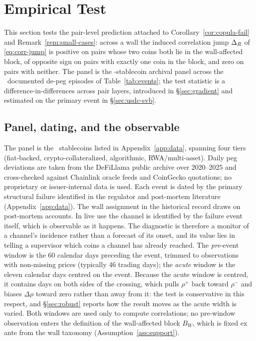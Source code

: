 
\section{Empirical Test}\label{sec:empirical}
This section tests the pair-level prediction attached to Corollary~\ref{cor:copula-fail} and Remark~\ref{rem:small-cases}: across a wall the induced correlation jump $\Delta_R$ of \eqref{eq:corr-jump} is positive on pairs whose two coins both lie in the wall-affected block, of opposite sign on pairs with exactly one coin in the block, and zero on pairs with neither. The panel is the \NPANEL-stablecoin archival panel across the \NEVENTS\ documented de-peg episodes of Table~\ref{tab:events}; the test statistic is a difference-in-differences across pair layers, introduced in \S\ref{sec:gradient} and estimated on the primary event in \S\ref{sec:usdc-svb}.

\subsection{Panel, dating, and the observable}\label{sec:panel}
The panel is the \NPANEL\ stablecoins listed in Appendix~\ref{app:data}, spanning four tiers (fiat-backed, crypto-collateralized, algorithmic, RWA/multi-asset). Daily peg deviations are taken from the DeFiLlama public archive over 2020--2025 and cross-checked against Chainlink oracle feeds and CoinGecko quotations; no proprietary or issuer-internal data is used. Each event is dated by the primary structural failure identified in the regulator and post-mortem literature (Appendix~\ref{app:data}). The wall assignment in the historical record draws on post-mortem accounts. In live use the channel is identified by the failure event itself, which is observable as it happens. The diagnostic is therefore a monitor of a channel's incidence rather than a forecast of its onset, and its value lies in telling a supervisor which coins a channel has already reached. The \emph{pre}-event window is the 60 calendar days preceding the event, trimmed to observations with non-missing prices (typically 46 trading days); the \emph{acute} window is the eleven calendar days centred on the event. Because the acute window is centred, it contains days on both sides of the crossing, which pulls $\rho^+$ back toward $\rho^-$ and biases $\Delta\rho$ toward zero rather than away from it: the test is conservative in this respect, and \S\ref{sec:robust} reports how the result moves as the acute width is varied. Both windows are used only to compute correlations; no pre-window observation enters the definition of the wall-affected block $B_W$, which is fixed ex ante from the wall taxonomy (Assumption~\ref{ass:support}).

